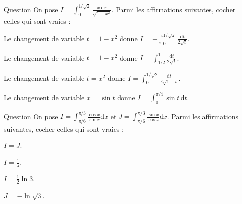 \begin{multi}[multiple,feedback=
{Avec \(t=1-x^2\), on a : \(t(0)=1\), \(t(1/\sqrt{2})=1/2\), \(\mathrm{d}t=-2x\mathrm{d}x\) et \(\displaystyle I=\int _{1/2}^1\frac{\mathrm{d}t}{2\sqrt{t}}\).
\vskip0mm
Avec \(t=x^2\), on a : \(t(0)=0\), \(t(1/\sqrt{2})=1/2\), \(\mathrm{d}t=2x\mathrm{d}x\) et \(\displaystyle I=\int _0^{1/2}\frac{\mathrm{d}t}{2\sqrt{1-t}}\).
\vskip0mm
Avec \(x=\sin t\), on a : \(t(0)=0\), \(t(1/\sqrt{2})=\pi/4\), \(\sqrt{1-x^2}=\cos t\), \(\mathrm{d}x=\cos t\, \mathrm{d}t\) et 
\[\displaystyle I=\int _0^{\pi/4}\sin t\mathrm{d}t.\]
}]{Question}
On pose \(\displaystyle I=\int _{0}^{1/\sqrt{2}}\frac{x\ \mathrm{d}x}{\sqrt{1-x^2}}\). Parmi les affirmations suivantes, cocher celles qui sont vraies :

    \item Le changement de variable \(t=1-x^2\) donne \(\displaystyle I=-\int _0^{1/\sqrt{2}}\frac{\mathrm{d}t}{2\sqrt{t}}\).
    \item* Le changement de variable \(t=1-x^2\) donne \(\displaystyle I=\int _{1/2}^1\frac{\mathrm{d}t}{2\sqrt{t}}\).
    \item Le changement de variable \(t=x^2\) donne \(\displaystyle I=\int _0^{1/\sqrt{2}}\frac{\mathrm{d}t}{2\sqrt{1-t}}\).
    \item* Le changement de variable \(x=\sin t\) donne \(\displaystyle I=\int _{0}^{\pi/4}\sin t\, \mathrm{d}t\).
\end{multi}


\begin{multi}[multiple,feedback=
{Avec \(t=\pi/2- x\Rightarrow \mathrm{d}t=-\mathrm{d}x\), on obtient : \(\displaystyle I=-\int _{\pi/3}^{\pi/6}\frac{\sin t}{\cos t}\mathrm{d}t=J\).
\vskip0mm
Avec \(t=\sin x\Rightarrow \mathrm{d}t=\cos x\, \mathrm{d}x\), on obtient : \(\displaystyle I=\int _{1/2}^{\sqrt{3}/2}\frac{\mathrm{d}t}{t}=\ln \sqrt{3}\).
}]{Question}
On pose \(\displaystyle I=\int _{\pi/6}^{\pi/3}\frac{\cos x}{\sin x}\mathrm{d}x\) et \(\displaystyle J=\int _{\pi/6}^{\pi/3}\frac{\sin x}{\cos x}\mathrm{d}x\). Parmi les affirmations suivantes, cocher celles qui sont vraies :

    \item* \(\displaystyle I=J\).
    \item \(\displaystyle I=\frac{1}{J}\).
    \item* \(\displaystyle I=\frac{1}{2}\ln 3\).
    \item \(\displaystyle J=-\ln \sqrt{3}\).
\end{multi}


